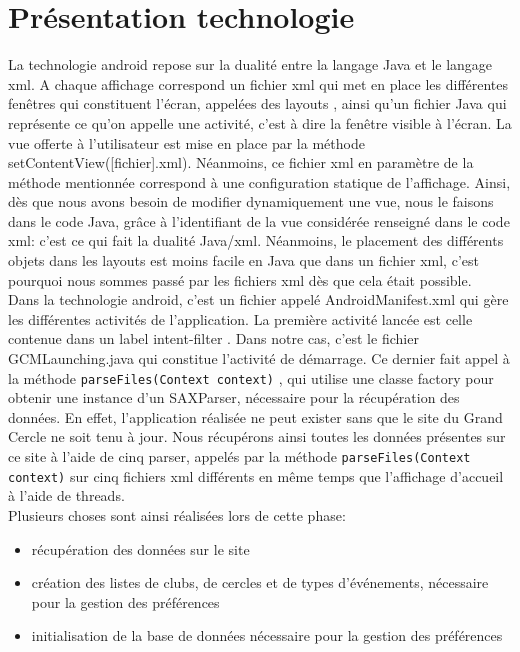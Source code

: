 \documentclass[a4paper, 11px]{article}
\begin{document}
\section{Présentation technologie}
La technologie android repose sur la dualité entre la langage Java et le langage xml. A chaque affichage correspond un fichier xml qui met en place les différentes fenêtres qui constituent l'écran, appelées des \og layouts \fg, ainsi qu'un fichier Java qui représente ce qu'on appelle une activité, c'est à dire la fenêtre visible à l'écran. La vue offerte à l'utilisateur est mise en place par la méthode setContentView([fichier].xml). Néanmoins, ce fichier xml en paramètre de la méthode mentionnée correspond à une configuration statique de l'affichage. Ainsi, dès que nous avons besoin de modifier dynamiquement une vue, nous le faisons dans le code Java, grâce à l'identifiant de la vue considérée renseigné dans le code xml: c'est ce qui fait la dualité Java/xml. Néanmoins, le placement des différents objets dans les layouts est moins facile en Java que dans un fichier xml, c'est pourquoi nous sommes passé par les fichiers xml dès que cela était possible.\\

Dans la technologie android, c'est un fichier appelé AndroidManifest.xml qui gère les différentes activités de l'application. La première activité lancée est celle contenue dans un label \og intent-filter \fg. Dans notre cas, c'est le fichier GCMLaunching.java qui constitue l'activité de démarrage. Ce dernier fait appel à la méthode \texttt{parseFiles(Context context)} , qui utilise une classe factory pour obtenir une instance d'un SAXParser, nécessaire pour la récupération des données. En effet, l'application réalisée ne peut exister sans que le site du Grand Cercle ne soit tenu à jour. Nous récupérons ainsi toutes les données présentes sur ce site à l'aide de cinq parser, appelés par la méthode \texttt{parseFiles(Context context)}
 sur cinq fichiers xml différents en même temps que l'affichage d'accueil à l'aide de threads.\\

\noindent Plusieurs choses sont ainsi réalisées lors de cette phase:
\begin{itemize}
\item récupération des données sur le site
\item création des listes de clubs, de cercles et de types d'événements, nécessaire pour la gestion des préférences
\item initialisation de la base de données nécessaire pour la gestion des préférences
\end{itemize}
\end{document}
